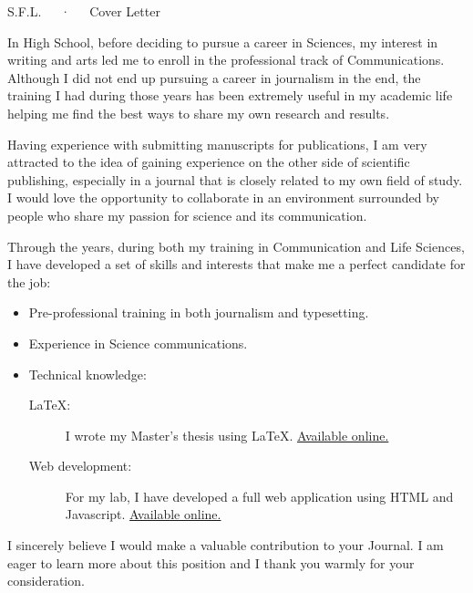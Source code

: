 \documentclass[11pt, letterpaper]{awesome-cv2}
\begin{document}
\makecvheader[R]

\makecvfooter{\today} {} {S.F.L.~~~·~~~Cover Letter}

\makelettertitle

\begin{cvletter}

In High School, before deciding to pursue a career in Sciences, my interest in
writing and arts led me to enroll in the professional track of Communications.
Although I did not end up pursuing a career in journalism in the end, the training I had
during those years has been extremely useful in my academic life helping me find
the best ways to share my own research and results.

Having experience with submitting manuscripts for publications, I am very
attracted to the idea of gaining experience on the other side of scientific
publishing, especially in a journal that is closely related to my own field of
study. I would love the opportunity to collaborate in an environment
surrounded by people who share my passion for science and its communication.

Through the years, during both my training in Communication and Life Sciences,
I have developed a set of skills and interests that make me a perfect candidate
for the job:
\begin{itemize}
  \item Pre-professional training in both journalism and typesetting.
  \item Experience in Science communications.
  \item Technical knowledge:
    \begin{description}
    \item[\LaTeX:] I wrote my Master's thesis using \LaTeX.
      \href{https://github.com/soffiafdz/TesisINB}{Available online.}
    \item[Web development:] For my lab, I have developed a full web
      application using HTML and Javascript.
      \href{https://github.com/soffiafdz/Qrater}{Available online.}
    \end{description}
\end{itemize}
I sincerely believe I would make a valuable contribution to your Journal. I am
eager to learn more about this position and I thank you warmly for your
consideration.

\end{cvletter}


\makeletterclosing
\end{document}
